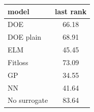 \begin{tabular}{|lc|}
\hline
model & last rank\\
\hline
DOE & 66.18 \\
DOE plain & 68.91 \\
ELM & 45.45 \\
Fitloss & 73.09 \\
GP & 34.55 \\
NN & 41.64 \\
No surrogate & 83.64 \\
\hline
\end{tabular}
